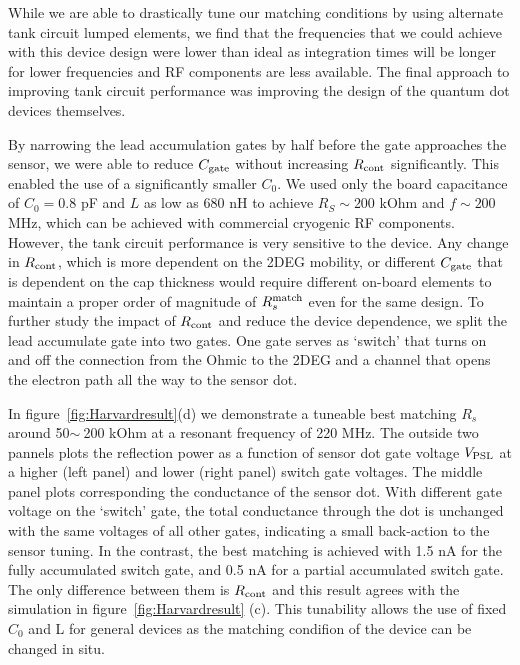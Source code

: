 \documentclass[]{article}
\begin{document}
	While we are able to drastically tune our matching conditions by using alternate tank circuit lumped elements, we find that the frequencies that we could achieve with this device design were lower than ideal as integration times will be longer for lower frequencies and RF components are less available. The final approach to improving tank circuit performance was improving the design of the quantum dot devices themselves.  
	
	By narrowing the lead accumulation gates by half before the gate approaches the sensor, we were able to reduce $C_{\rm gate}$ without increasing $R_{\rm cont}$ significantly.  This enabled the use of a significantly smaller $C_0$. We used only the board capacitance of $C_0 = 0.8$ pF and $L$ as low as 680 nH to achieve $R_S\sim 200$ kOhm and $f\sim 200$ MHz, which can be achieved with commercial cryogenic RF components. 	
	However, the tank circuit performance is very sensitive to the device. Any change in $R_{\rm cont}$, which is more dependent on the 2DEG mobility, or different $C_{\rm gate}$ that is dependent on the cap thickness would require different on-board elements to maintain a proper order of magnitude of $R^{\rm match}_s$ even for the same design. To further study the impact of $R_{\rm cont}$ and reduce the device dependence, we split the lead accumulate gate into two gates. One gate serves as ‘switch’ that turns on and off the connection from the Ohmic to the 2DEG and a channel that opens the electron path all the way to the sensor dot.
	
	In figure\ \ref{fig:Harvardresult}(d) we demonstrate a tuneable best matching $R_s$ around 50$\sim~$200 kOhm at a resonant frequency of 220 MHz. The outside two pannels plots the reflection power as a function of sensor dot gate voltage $V_{\rm PSL}$ at a higher (left panel) and lower (right panel) switch gate voltages. The middle panel plots corresponding the conductance of the sensor dot. With different gate voltage on the ‘switch’ gate, the total conductance through the dot is unchanged with the same voltages of all other gates, indicating a small back-action to the sensor tuning. In the contrast, the best matching is achieved with 1.5 nA for the fully accumulated switch gate, and 0.5 nA for a partial accumulated switch gate. The only difference between them is $R_{\rm cont}$ and this result agrees with the simulation in figure\ \ref{fig:Harvardresult} (c). This tunability allows the use of fixed $C_0$ and L for general devices as the matching condifion of the device can be changed in situ.
	
\end{document}
